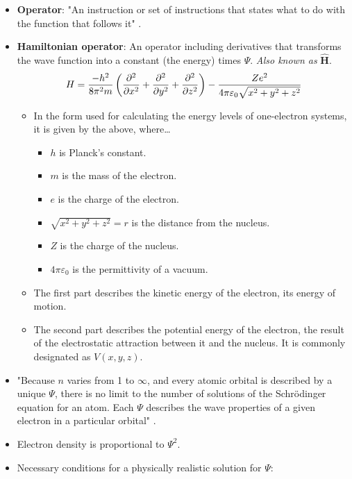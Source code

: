 \documentclass[../notes.tex]{subfiles}
\begin{document}
\begin{itemize}
    \item \textbf{Operator}: "An instruction or set of instructions that states what to do with the function that follows it" \parencite[14]{bib:MiesslerFischerTarr}.
    \item \textbf{Hamiltonian operator}: An operator including derivatives that transforms the wave function into a constant (the energy) times $\Psi$. \emph{Also known as} $\bm{\hat{H}}$.
    \begin{equation*}
        H = \frac{-h^2}{8\pi^2m}\left( \pdv[2]{x}+\pdv[2]{y}+\pdv[2]{z} \right)-\frac{Ze^2}{4\pi\varepsilon_0\sqrt{x^2+y^2+z^2}}
    \end{equation*}
    \begin{itemize}
        \item In the form used for calculating the energy levels of one-electron systems, it is given by the above, where\dots
        \begin{itemize}
            \item $h$ is Planck's constant.
            \item $m$ is the mass of the electron.
            \item $e$ is the charge of the electron.
            \item $\sqrt{x^2+y^2+z^2}=r$ is the distance from the nucleus.
            \item $Z$ is the charge of the nucleus.
            \item $4\pi\varepsilon_0$ is the permittivity of a vacuum.
        \end{itemize}
        \item The first part describes the kinetic energy of the electron, its energy of motion.
        \item The second part describes the potential energy of the electron, the result of the electrostatic attraction between it and the nucleus. It is commonly designated as $V(x,y,z)$.
    \end{itemize}
    \item "Because $n$ varies from 1 to $\infty$, and every atomic orbital is described by a unique $\Psi$, there is no limit to the number of solutions of the Schr\"{o}dinger equation for an atom. Each $\Psi$ describes the wave properties of a given electron in a particular orbital" \parencite[15]{bib:MiesslerFischerTarr}.
    \item Electron density is proportional to $\Psi^2$.
    \item Necessary conditions for a physically realistic solution for $\Psi$:

\end{itemize}
\end{document}
